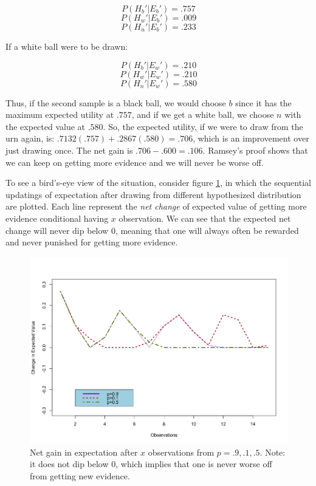 \[P(H_b'|E_b') = .757\] \[P(H_w'|E_b') = .009\]
\[P(H_n'|E_b') = .233\]

If a white ball were to be drawn:

\[P(H_b'|E_w') = .210\] \[P(H_w'|E_w') = .210\] \[P(H_n'|E_w') = .580\]

Thus, if the second sample is a black ball, we would choose \(b\) since
it has the maximum expected utility at \(.757\), and if we get a white
ball, we choose \(n\) with the expected value at \(.580\). So, the
expected utility, if we were to draw from the urn again, is:
\(.7132(.757) + .2867(.580) = .706\), which is an improvement over
just drawing once. The net gain is \(.706 -.600 = .106\). Ramsey's
proof shows that we can keep on getting more evidence and we will never
be worse off. 

To see a bird's-eye view of the situation, consider figure \ref{fig:expectedchange}, in which the sequential updatings of expectation after drawing from different hypothesized distribution are plotted. Each line represent the \emph{net change} of expected value of getting more evidence conditional having $x$ observation. We can see that the expected net change will never dip below $0$, meaning that one will always often be rewarded and never punished for getting more evidence.

\begin{figure}[h] 
\begin{center}
\includegraphics[scale=0.5]{Expectedchange.png}
	\caption{Net gain in expectation after $x$ observations from $p=.9,.1,.5$. Note: it does not dip below 0, which implies that one is never worse off from getting new evidence.}
	\label{fig:expectedchange}
\end{center}	
\end{figure}


